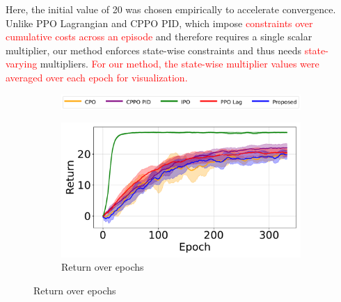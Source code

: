 Here, the initial value of 20 was chosen empirically to accelerate convergence.
Unlike PPO Lagrangian and CPPO PID, which impose \textcolor{red}{constraints over cumulative costs across an episode} and therefore requires a single scalar multiplier, our method enforces state-wise constraints and thus needs \textcolor{red}{state-varying} multipliers.
\textcolor{red}{For our method, the state-wise multiplier values were averaged over each epoch for visualization.}

\begin{figure}[H]
    \centering

    \begin{subfigure}{0.65\textwidth}
        \centering
        \includegraphics[width=\linewidth]{figure/PointGoal/limit 2/legend_common.pdf}
    \end{subfigure}

    \vspace{0.5em} %


    \begin{minipage}{0.48\textwidth}
        \centering
        \begin{subfigure}{\linewidth}
            \centering
            \includegraphics[width=\linewidth]{figure/PointGoal/limit 1.5/EpRet.pdf}
            \caption{Return over epochs}
        \end{subfigure}


\end{minipage}
\end{figure}
